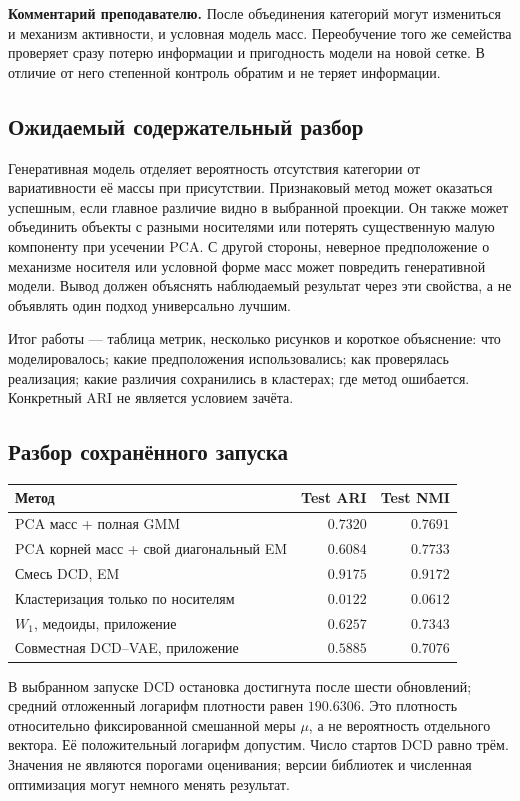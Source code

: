 \documentclass[11pt,a4paper]{article}
\newcommand{\teach}[1]{\par\textbf{Комментарий преподавателю.} #1\par}
\begin{document}
\teach{После объединения категорий могут измениться и механизм
активности, и условная модель масс. Переобучение того же семейства
проверяет сразу потерю информации и пригодность модели на новой сетке.
В отличие от него степенной контроль обратим и не теряет информации.}

\subsection{Ожидаемый содержательный разбор}
Генеративная модель отделяет вероятность отсутствия категории от
вариативности её массы при присутствии. Признаковый метод может оказаться
успешным, если главное различие видно в выбранной проекции. Он также
может объединить объекты с разными носителями или потерять существенную
малую компоненту при усечении PCA. С другой стороны, неверное предположение
о механизме носителя или условной форме масс может повредить генеративной
модели. Вывод должен объяснять наблюдаемый результат через эти свойства,
а не объявлять один подход универсально лучшим.

Итог работы --- таблица метрик, несколько рисунков и короткое объяснение:
что моделировалось; какие предположения использовались; как проверялась
реализация; какие различия сохранились в кластерах; где метод ошибается.
Конкретный ARI не является условием зачёта.

\subsection{Разбор сохранённого запуска}

\begin{center}
\begin{tabular}{lrr}
\toprule
Метод & Test ARI & Test NMI\\
\midrule
PCA масс + полная GMM & $0.7320$ & $0.7691$\\
PCA корней масс + свой диагональный EM & $0.6084$ & $0.7733$\\
Смесь DCD, EM & $0.9175$ & $0.9172$\\
Кластеризация только по носителям & $0.0122$ & $0.0612$\\
$W_1$, медоиды, приложение & $0.6257$ & $0.7343$\\
Совместная DCD--VAE, приложение & $0.5885$ & $0.7076$\\
\bottomrule
\end{tabular}
\end{center}

В выбранном запуске DCD остановка достигнута после шести обновлений;
средний отложенный логарифм плотности равен $190.6306$.
Это плотность относительно фиксированной смешанной меры $\mu$,
а не вероятность отдельного вектора. Её положительный логарифм допустим.
Число стартов DCD равно трём. Значения не являются порогами оценивания;
версии библиотек и численная оптимизация могут немного менять результат.
\end{document}
